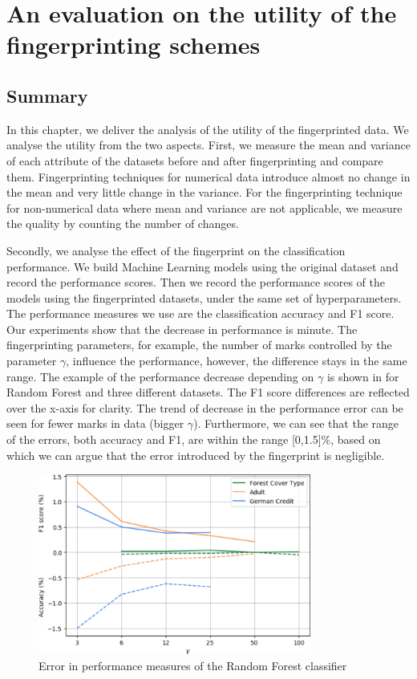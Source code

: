 \chapter{An evaluation on the utility of the fingerprinting schemes}\label{chapter:Utility}





\section{Summary}
In this chapter, we deliver the analysis of the utility of the fingerprinted data. We analyse the utility from the two aspects. First, we measure the mean and variance of each attribute of the datasets before and after fingerprinting and compare them. Fingerprinting techniques for numerical data introduce almost no change in the mean and very little change in the variance. 
For the fingerprinting technique for non-numerical data where mean and variance are not applicable, we measure the quality by counting the number of changes. 

Secondly, we analyse the effect of the fingerprint on the classification performance.
We build Machine Learning models using the original dataset and record the performance scores. Then we record the performance scores of the models using the fingerprinted datasets, under the same set of hyperparameters.
The performance measures we use are the classification accuracy and F1 score.
Our experiments show that the decrease in performance is minute. The fingerprinting parameters, for example, the number of marks controlled by the parameter $\gamma$, influence the performance, however, the difference stays in the same range.
The example of the performance decrease depending on $\gamma$ is shown in  for Random Forest and three different datasets. 
The F1 score differences are reflected over the x-axis for clarity.
The trend of decrease in the performance error can be seen for fewer marks in data (bigger $\gamma$).
Furthermore, we can see that the range of the errors, both accuracy and F1, are within the range [0,1.5]\%, based on which we can argue that the error introduced by the fingerprint is negligible.
\begin{figure}
    \centering
    \includegraphics[width=0.8\textwidth]{Figures/classification-screenshot.PNG}
    \caption{Error in performance measures of the Random Forest classifier}
    \label{fig:classification-error}
\end{figure}

